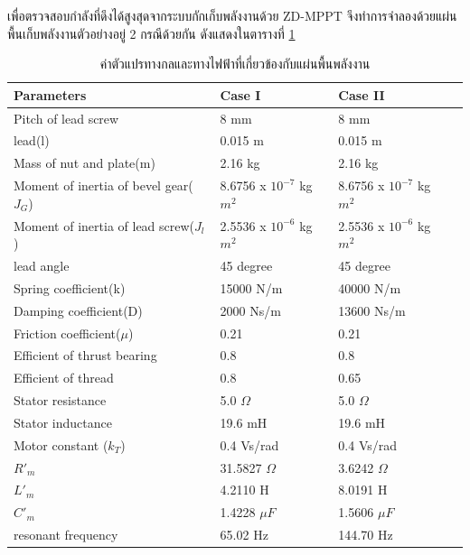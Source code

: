 \documentclass[11pt,a4paper]{article}
\begin{document}
เพื่อตรวจสอบกำลังที่ดึงได้สูงสุดจากระบบกักเก็บพลังงานด้วย ZD-MPPT จึงทำการจำลองด้วยแผ่นพื้นเก็บพลังงานตัวอย่างอยู่ 2 กรณีด้วยกัน ดังแสดงในตารางที่ \ref{para_dc}

\begin{table}[H]
    \centering
    \begin{tabular}{ | l | l | l | p{5cm} |}
        \hline
        \textbf{Parameters}                      & \textbf{Case I}   & \textbf{Case II}       \\ \hline
        Pitch of lead screw                      & 8 mm        & 8 mm          \\ \hline
        lead(l)                                  & 0.015 m     & 0.015 m       \\ \hline
        Mass of nut and plate(m)                 & 2.16 kg     & 2.16 kg       \\ \hline
        Moment of inertia of bevel gear($J_{G}$) & 8.6756 x $10^{-7}$ kg$m^2$  & 8.6756 x $10^{-7}$ kg$m^2$ \\ \hline
        Moment of inertia of lead screw($J_{l}$) & 2.5536 x $10^{-6}$ kg$m^2$  & 2.5536 x $10^{-6}$ kg$m^2$ \\ \hline
        lead angle                               & 45 degree   & 45 degree     \\ \hline
        Spring coefficient(k)                    & 15000 N/m   & 40000 N/m     \\ \hline
        Damping coefficient(D)                   & 2000 Ns/m   & 13600 Ns/m    \\ \hline
        Friction coefficient($\mu$)              & 0.21        & 0.21          \\ \hline
        Efficient of thrust bearing              & 0.8         & 0.8           \\ \hline
        Efficient of thread                      & 0.8         & 0.65          \\ \hline
        Stator resistance                        & 5.0 $\Omega$ & 5.0 $\Omega$ \\ \hline
        Stator inductance                        & 19.6 mH     & 19.6 mH       \\ \hline
        Motor constant ($k_{T}$)                 & 0.4 Vs/rad  & 0.4 Vs/rad    \\ \hline
        $R'_{m}$                                 & 31.5827 $\Omega$  & 3.6242 $\Omega$    \\ \hline
        $L'_{m}$                                 & 4.2110 H         & 8.0191 H      \\ \hline
        $C'_{m}$                                 & 1.4228 $\mu F$   & 1.5606 $\mu F$    \\ \hline
        resonant frequency                       & 65.02 Hz    & 144.70 Hz    \\ \hline
    \end{tabular}
    \caption{ค่าตัวแปรทางกลและทางไฟฟ้าที่เกี่ยวข้องกับแผ่นพื้นพลังงาน \cite{GpH:01}}
    \label{para_dc}
\end{table}
\end{document}
